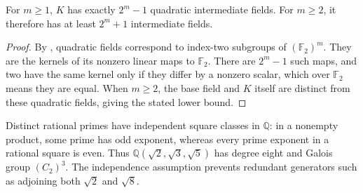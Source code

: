 \begin{corollary}\label{multiquadratic-subfields}
For $m\ge1$, $K$ has exactly $2^m-1$ quadratic intermediate fields.
For $m\ge2$, it therefore has at least $2^m+1$ intermediate fields.
\end{corollary}
\begin{proof}\label{multiquadratic-subfields-proof}
By , quadratic fields
correspond to index-two subgroups of $(\mathbb F_2)^m$.
They are the kernels of its nonzero linear maps to $\mathbb F_2$.
There are $2^m-1$ such maps, and two have the same kernel only if
they differ by a nonzero scalar, which over $\mathbb F_2$ means they
are equal. When $m\ge2$, the base field and $K$ itself are distinct
from these quadratic fields, giving the stated lower bound.
\end{proof}
\begin{example}\label{rational-prime-squares}
Distinct rational primes have independent square classes in $\mathbb Q$:
in a nonempty product, some prime has odd exponent, whereas every
prime exponent in a rational square is even. Thus
$\mathbb Q(\sqrt2,\sqrt3,\sqrt5)$ has degree eight and Galois group
$(C_2)^3$. The independence assumption prevents redundant generators
such as adjoining both $\sqrt2$ and $\sqrt8$.
\end{example}

